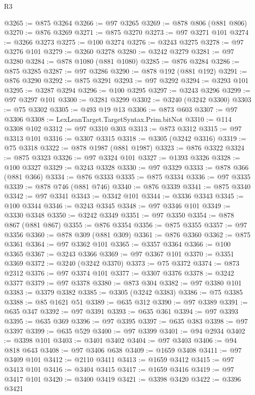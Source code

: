 \begin{lexlean}{R3}
\begin{coremodule}
@3265 := @875 @3264
@3266 := @97 @3265
@3269 := @878 @806 (@881 @806)
@3270 := @876 @3269
@3271 := @875 @3270
@3273 := @97 @3271 @101
@3274 := @3266 @3273
@3275 := @100 @3274
@3276 := @3243 @3275
@3278 := @97 @3276 @101
@3279 := @3260 @3278
@3280 := @3242 @3279
@3281 := @97 @3280
@3284 := @878 @1080 (@881 @1080)
@3285 := @876 @3284
@3286 := @875 @3285
@3287 := @97 @3286
@3290 := @878 @192 (@881 @192)
@3291 := @876 @3290
@3292 := @875 @3291
@3293 := @97 @3292
@3294 := @3293 @101
@3295 := @3287 @3294
@3296 := @100 @3295
@3297 := @3243 @3296
@3299 := @97 @3297 @101
@3300 := @3281 @3299
@3302 := @3240 (@3242 @3300)
@3303 := @75 @3302
@3305 := @493 @19 @13
@3306 := @873 @603
@3307 := @97 @3306
@3308 := LexLeanTarget.TargetSyntax.Prim.bitNot
@3310 := @114 @3308 @102
@3312 := @97 @3310 @303
@3313 := @873 @3312
@3315 := @97 @3313 @101
@3316 := @3307 @3315
@3318 := @3305 (@3242 @3316)
@3319 := @75 @3318
@3322 := @878 @1987 (@881 @1987)
@3323 := @876 @3322
@3324 := @875 @3323
@3326 := @97 @3324 @101
@3327 := @1393 @3326
@3328 := @100 @3327
@3329 := @3243 @3328
@3330 := @97 @3329
@3333 := @878 @366 (@881 @366)
@3334 := @876 @3333
@3335 := @875 @3334
@3336 := @97 @3335
@3339 := @878 @746 (@881 @746)
@3340 := @876 @3339
@3341 := @875 @3340
@3342 := @97 @3341
@3343 := @3342 @101
@3344 := @3336 @3343
@3345 := @100 @3344
@3346 := @3243 @3345
@3348 := @97 @3346 @101
@3349 := @3330 @3348
@3350 := @3242 @3349
@3351 := @97 @3350
@3354 := @878 @867 (@881 @867)
@3355 := @876 @3354
@3356 := @875 @3355
@3357 := @97 @3356
@3360 := @878 @309 (@881 @309)
@3361 := @876 @3360
@3362 := @875 @3361
@3364 := @97 @3362 @101
@3365 := @3357 @3364
@3366 := @100 @3365
@3367 := @3243 @3366
@3369 := @97 @3367 @101
@3370 := @3351 @3369
@3372 := @3240 (@3242 @3370)
@3373 := @75 @3372
@3374 := @873 @2312
@3376 := @97 @3374 @101
@3377 := @3307 @3376
@3378 := @3242 @3377
@3379 := @97 @3378
@3380 := @873 @304
@3382 := @97 @3380 @101
@3383 := @3379 @3382
@3385 := @3305 (@3242 @3383)
@3386 := @75 @3385
@3388 := @85 @1621 @51
@3389 := @635 @312
@3390 := @97 @3389
@3391 := @635 @347
@3392 := @97 @3391
@3393 := @635 @361
@3394 := @97 @3393
@3395 := @635 @369
@3396 := @97 @3395
@3397 := @635 @383
@3398 := @97 @3397
@3399 := @635 @529
@3400 := @97 @3399
@3401 := @94 @2934
@3402 := @3398 @101
@3403 := @3401 @3402
@3404 := @97 @3403
@3406 := @94 @818 @643
@3408 := @97 @3406 @638
@3409 := @1659 @3408
@3411 := @97 @3409 @101
@3412 := @2110 @3411
@3413 := @1659 @3412
@3415 := @97 @3413 @101
@3416 := @3404 @3415
@3417 := @1659 @3416
@3419 := @97 @3417 @101
@3420 := @3400 @3419
@3421 := @3398 @3420
@3422 := @3396 @3421

\end{coremodule}
\end{lexlean}
